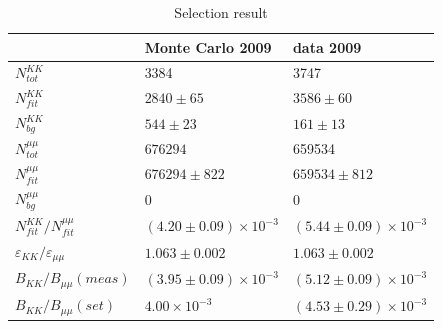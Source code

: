 \documentclass[a4paper,12pt]{article}
\begin{document}
\begin{table}
  \centering
  \label{tab:res09}
  \caption{Selection result}
  \begin{tabular}{lll} 
                          & Monte Carlo 2009 & data 2009      \\  \hline
  $ N_{tot}^{KK}$         & 3384             &    3747        \\            
  $ N_{fit}^{KK}$         & $2840\pm65$      &    $3586\pm60$ \\
  $ N_{bg}^{KK}$          & $544\pm23$       &          $161 \pm 13$   \\
  $ N_{tot}^{\mu\mu}$     & $676294$         &       659534   \\
  $ N_{fit}^{\mu\mu}$     & $676294\pm822$   &       $659534 \pm 812$   \\
  $ N_{bg}^{\mu\mu}$      & $0           $   &       0    \\
  $ N_{fit}^{KK}/N_{fit}^{\mu\mu}$& $(4.20 \pm 0.09)\times10^{-3} $ & $(5.44 \pm 0.09)\times 10^{-3}$  \\
  $\varepsilon_{KK}/\varepsilon_{\mu\mu}$ & $1.063 \pm 0.002$ &  $1.063 \pm 0.002$  \\
    $ B_{KK}/B_{\mu\mu}(meas)$   & $(3.95 \pm 0.09)\times 10^{-3}$  & $(5.12 \pm 0.09)\times 10^{-3}$ \\
    $ B_{KK}/B_{\mu\mu}(set)$   & $4.00\times 10^{-3}$  & $(4.53 \pm 0.29)\times 10^{-3}$
\end{tabular}
\end{table}
\end{document}
